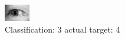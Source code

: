 \begin{figure}[h!]
\begin{center}
\includegraphics[width=0.60\columnwidth]{figures/ID3124_class_3_target_4.png}
\end{center}
\caption{ Classification: 3 actual target: 4}
\label{fig:ID3124_class_3_target_4}
\end{figure}
